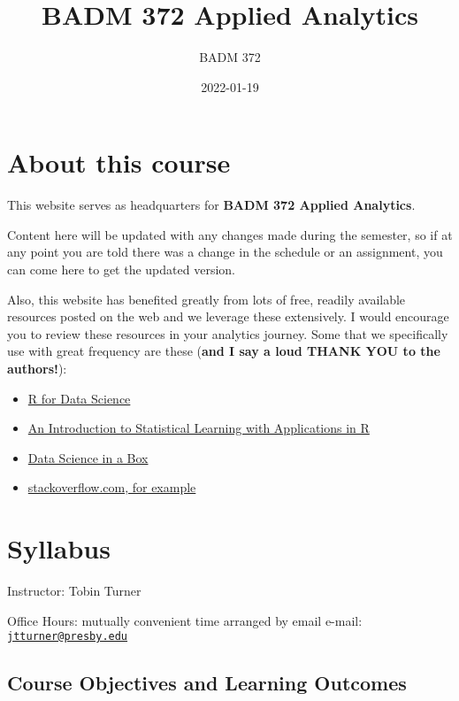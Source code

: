 \documentclass[
]{book}
\title{BADM 372 Applied Analytics}
\author{BADM 372}
\date{2022-01-19}
\providecommand{\tightlist}{%
  \setlength{\itemsep}{0pt}\setlength{\parskip}{0pt}}
\begin{document}
\maketitle

{
\setcounter{tocdepth}{1}
\tableofcontents
}
\hypertarget{about-this-course}{%
\chapter{About this course}\label{about-this-course}}

This website serves as headquarters for \textbf{BADM 372 Applied Analytics}.

Content here will be updated with any changes made during the semester, so if at any point you are told there was a change in the schedule or an assignment, you can come here to get the updated version.

Also, this website has benefited greatly from lots of free, readily available resources posted on the web and we leverage these extensively. I would encourage you to review these resources in your analytics journey. Some that we specifically use with great frequency are these (\textbf{and I say a loud THANK YOU to the authors!}):

\begin{itemize}
\tightlist
\item
  \href{https://r4ds.had.co.nz/}{R for Data Science}
\item
  \href{https://trevorhastie.github.io/ISLR/}{An Introduction to Statistical Learning with Applications in R}
\item
  \href{https://datasciencebox.org/}{Data Science in a Box}
\item
  \href{https://stackoverflow.com/questions/4862178/remove-rows-with-all-or-some-nas-missing-values-in-data-frame?rq=1}{stackoverflow.com, for example}
\end{itemize}

\hypertarget{syllabus}{%
\chapter{Syllabus}\label{syllabus}}

Instructor: Tobin Turner

Office Hours: mutually convenient time arranged by email e-mail: \href{mailto:jtturner@presby.edu}{\nolinkurl{jtturner@presby.edu}}

\hypertarget{course-objectives-and-learning-outcomes}{%
\section{Course Objectives and Learning Outcomes}\label{course-objectives-and-learning-outcomes}}
\end{document}
